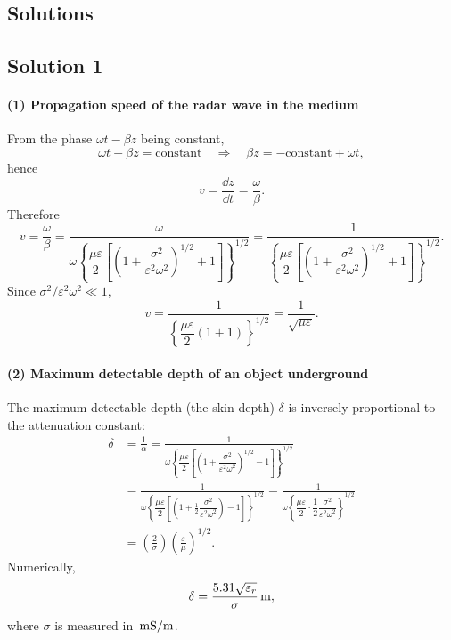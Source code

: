 \subsection*{Solutions}

\subsection*{Solution 1}

\paragraph{(1) Propagation speed of the radar wave in the medium}

From the phase $\omega t-\beta z$ being constant,
\[
\omega t-\beta z=\text{constant}\quad\Rightarrow\quad \beta z=-\text{constant}+\omega t,
\]
hence
\[
v=\frac{\dd z}{\dd t}=\frac{\omega}{\beta}.
\]
Therefore
\[
v=\frac{\omega}{\beta}
=\frac{\omega}{\omega\left\{\dfrac{\mu\varepsilon}{2}\left[\left(1+\dfrac{\sigma^2}{\varepsilon^2\omega^2}\right)^{1/2}+1\right]\right\}^{1/2}}
=\frac{1}{\left\{\dfrac{\mu\varepsilon}{2}\left[\left(1+\dfrac{\sigma^2}{\varepsilon^2\omega^2}\right)^{1/2}+1\right]\right\}^{1/2}}.
\]
Since $\sigma^2/\varepsilon^2\omega^2\ll1$,
\[
v=\frac{1}{\left\{\dfrac{\mu\varepsilon}{2}(1+1)\right\}^{1/2}}
=\frac{1}{\sqrt{\mu\varepsilon}}.
\]

\paragraph{(2) Maximum detectable depth of an object underground}

The maximum detectable depth (the skin depth) $\delta$ is inversely proportional to the attenuation constant:
\begin{align*}
\delta&=\frac{1}{\alpha}
=\frac{1}{\omega\left\{\dfrac{\mu\varepsilon}{2}\left[\left(1+\dfrac{\sigma^2}{\varepsilon^2\omega^2}\right)^{1/2}-1\right]\right\}^{1/2}}\\
&=\frac{1}{\omega\left\{\dfrac{\mu\varepsilon}{2}\left[\left(1+\frac{1}{2}\dfrac{\sigma^2}{\varepsilon^2\omega^2}\right)-1\right]\right\}^{1/2}}
=\frac{1}{\omega\left\{\dfrac{\mu\varepsilon}{2}\cdot\dfrac{1}{2}\dfrac{\sigma^2}{\varepsilon^2\omega^2}\right\}^{1/2}}\\
&=\left(\frac{2}{\sigma}\right)\left(\frac{\varepsilon}{\mu}\right)^{1/2}.
\end{align*}
Numerically,
\[
\delta=\frac{5.31\sqrt{\varepsilon_r}}{\sigma}\,\mathrm{m},
\]
where $\sigma$ is measured in $\,\mathrm{mS/m}$.

